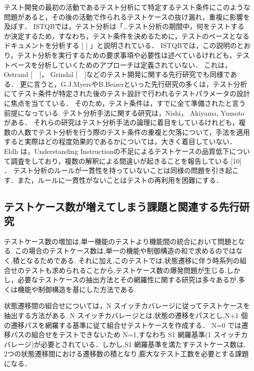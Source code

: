 テスト開発の最初の活動であるテスト分析にて特定するテスト条件にこのような問題があると，その後の活動で作られるテストケースの抜け漏れ，重複に影響を及ぼす．
ISTQBでは，テスト分析は「…テスト分析の期間中，何をテストするか決定するため，すなわち，テスト条件を決めるために，テストのベースとなるドキュメントを分析する [ ] 」と説明されている．
ISTQBでは，この説明のとおり，テスト分析を実行するための要求事項や必要性は述べているけれども，テストベースを分析していくためのアプローチは定義されていない．
これは，Ostrand [　]， Grindal [　]などのテスト開発に関する先行研究でも同様である．
更に言うと，G.J.MyersやB.Beizerといった先行研究の多くは，テスト分析にてテスト条件が特定された後のテスト設計で行われるテストパラメータの設計に焦点を当てている．
そのため，テスト条件は，すでに全て準備されたと言う前提になっている.
テスト分析手法に関する研究は，Nishi\cite{nishi2012based}， Akiyama\cite{Akiyama2014}, Yumoto\cite{yumoto2013test}がある．
それらの研究はテスト分析手法の論理に着目をしているけれども，複数の人数でテスト分析を行う際のテスト条件の重複と欠落について，手法を適用すると実際はどの程度効果的であるかについては，大きく着目していない．
Eldh は，Understanding Instructionの不足によるテストケースの品質低下について調査をしており，複数の解釈による間違いが起きることを報告している [10] ．
テスト分析のルールが一貫性を持っていないことは同様の問題を引き起こす．また，ルールに一貫性がないことはテストの再利用を困難にする．

\subsection{テストケース数が増えてしまう課題と関連する先行研究}
テストケース数の増加は,単一機能のテストより機能間の統合において問題となる.
この場合のテストケース数は,単一の機能や制御構造の和で求めるのではなく,積となるためである.
それに加え,このテストでは,状態遷移に伴う時系列の組合せのテストも求められることから,テストケース数の爆発問題が生じる.しかし，必要なテストケースの抽出方法とその網羅性に関する研究は多々あるが,多くは機能や制御構造を基にした方法である.\cite{myers2011art}

状態遷移間の組合せについては，N スイッチカバレージに従ってテストケースを抽出する方法がある. \cite{beiz90}
N スイッチカバレージとは,状態の遷移をパスとし,N+1 個の遷移パスを網羅する基準に従て組合せテストケースを作成する．
N=0 では遷移パスの組合せをテストできないため N=1,すなわち S1 網羅基準(1 スイッチカバレージ)が必要とされている．しかし,S1 網羅基準を満たすテストケース数は, 2つの状態遷移間における遷移数の積となり,膨大なテスト工数を必要とする課題になる．


